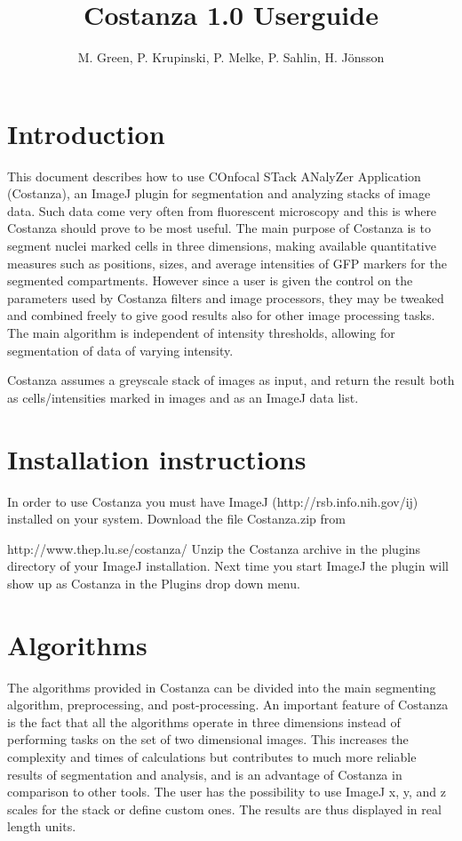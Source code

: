 \documentclass[a4paper,12pt]{article}
\title{Costanza 1.0 Userguide}
\author{M. Green, P. Krupinski, P. Melke, P. Sahlin, H. Jönsson}
\begin{document}
\maketitle


\section{Introduction}
This document describes how to use COnfocal STack ANalyZer Application
(Costanza), an ImageJ\cite{Abramoff2004} plugin for segmentation and analyzing
stacks of image data. Such data come very often from fluorescent microscopy and
this is where Costanza should prove to be most useful. The main purpose of
Costanza is to segment nuclei marked cells in three dimensions, making
available quantitative measures such as positions, sizes, and average
intensities of GFP markers for the segmented compartments. However since a user
is given the control on the parameters used by Costanza filters and image
processors, they may be tweaked and combined freely to give good results also
for other image processing tasks. The main algorithm is independent of
intensity thresholds, allowing for segmentation of data of varying intensity.

Costanza assumes a greyscale stack of images as input, and return the result
both as cells/intensities marked in images and as an ImageJ data list.

\section{Installation instructions}
In order to use Costanza you must have ImageJ
(http://rsb.info.nih.gov/ij) installed on your system. Download the
file Costanza.zip from

http://www.thep.lu.se/costanza/
Unzip the Costanza archive in the plugins directory of your ImageJ
installation. Next time you start ImageJ the plugin will show up as Costanza
in the Plugins drop down menu.

\section{Algorithms}
The algorithms provided in Costanza can be divided into the main segmenting
algorithm, preprocessing, and post-processing. An important feature of
Costanza is the fact that all the algorithms operate in three dimensions
instead of performing tasks on the set of two dimensional images. This
increases the complexity and times of calculations but contributes to much
more reliable results of segmentation and analysis, and is an advantage of
Costanza in comparison to other tools. The user has the possibility to use
ImageJ x, y, and z scales for the stack or define custom ones. The results are
thus displayed in real length units.
\end{document}
